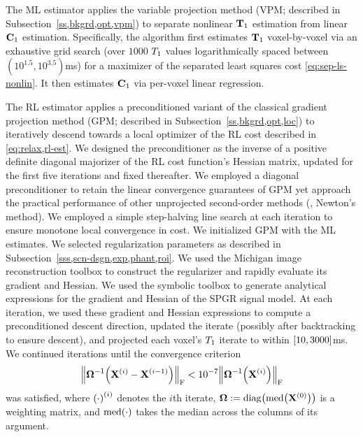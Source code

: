The ML estimator applies the variable projection method
(VPM; described in Subsection~\ref{ss,bkgrd,opt,vpm})
to separate nonlinear $\mathbf{T}_1$ estimation 
from linear $\mathbf{C}_{1}$ estimation.
Specifically,
the algorithm first estimates $\mathbf{T}_1$ voxel-by-voxel
via an exhaustive grid search 
(over $1000$ $T_1$ values
logarithmically spaced between $(10^{1.5}, 10^{3.5})$ms)
for a maximizer
of the separated least squares cost \eqref{eq:sep-ls-nonlin}.
It then estimates $\mathbf{C}_{1}$ 
via per-voxel linear regression.

The RL estimator applies a preconditioned variant
of the classical gradient projection method 
(GPM; described in Subsection~\ref{ss,bkgrd,opt,loc})
to iteratively descend 
towards a local optimizer 
of the RL cost
described in \eqref{eq:relax,rl-est}.
We designed the preconditioner
as the inverse
of a positive definite diagonal majorizer
of the RL cost function's Hessian matrix,
updated for the first five iterations
and fixed thereafter.
We employed a diagonal preconditioner
to retain the linear convergence guarantees
of GPM \cite{bertsekas:82:pnm}
yet approach the practical performance
of other unprojected second-order methods
(\eg, Newton's method).
We employed a simple step-halving line search
at each iteration
to ensure monotone local convergence in cost.
We initialized GPM 
with the ML estimates.
We selected regularization parameters
as described in Subsection~\ref{sss,scn-dsgn,exp,phant,roi}.
We used the Michigan image reconstruction toolbox \cite{fessler:16:irt}
to construct the regularizer
and rapidly evaluate its gradient and Hessian.
We used the \matlab symbolic toolbox
to generate analytical expressions
for the gradient and Hessian 
of the SPGR signal model.
At each iteration,
we used these gradient and Hessian expressions
to compute a preconditioned descent direction,
updated the iterate
(possibly after backtracking to ensure descent),
and projected each voxel's $T_1$ iterate
to within $\brac{10,3000}$ms.
We continued iterations
until the convergence criterion
\begin{align}
   \frob{\bmOmega^{-1}\paren{\iter{\bmX}{i}-\iter{\bmX}{i-1}}} 
   		< 10^{-7} \frob{\bmOmega^{-1}\paren{\iter{\bmX}{i}}}
   \label{eq:relax,conv-crit}
\end{align}
was satisfied,
where $\iter{\paren{\cdot}}{i}$ denotes the $i$th iterate,
$\bmOmega := \diag{\med{\iter{\bmX}{0}}}$
is a weighting matrix,
and $\med{\cdot}$ takes the median 
across the columns of its argument.

